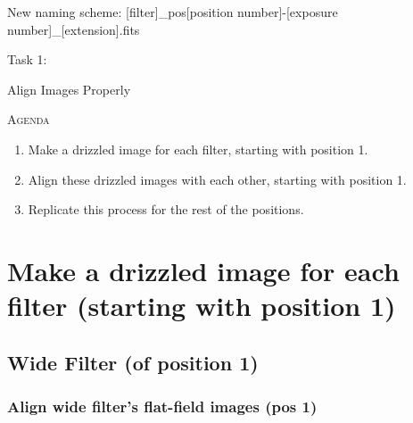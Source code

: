 \documentclass[11pt,obeyspaces]{article} %
\begin{document}
New naming scheme: [filter]\_pos[position number]-[exposure number]\_[extension].fits \\

\newpage

\vspace*{\fill}
\centerline{\Huge Task 1:}
\bigskip
\centerline{\Huge Align Images Properly}
\vspace*{\fill}

\newpage 

\centerline{\textsc{\Large Agenda}}
\begin{enumerate}
\item Make a drizzled image for each filter, starting with position 1.  
\item Align these drizzled images with each other, starting with position 1. 
\item Replicate this process for the rest of the positions.
\end{enumerate}

\section{Make a drizzled image for each filter (starting with position 1)}

\subsection{Wide Filter (of position 1)}
\subsubsection{Align wide filter's flat-field images (pos 1)}
 
\end{document}
